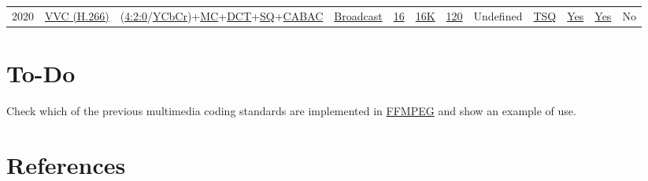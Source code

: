 \begin{tabular}{lrrrrrrrrrrr}
2020 & %
\href{https://en.wikipedia.org/wiki/Versatile_Video_Coding}{VVC (H.266)} & %
(\href{https://en.wikipedia.org/wiki/Chroma_subsampling#4:2:0}{4:2:0}/\href{https://en.wikipedia.org/wiki/JPEG#Color_space_transformation}{YCbCr})+\href{https://en.wikipedia.org/wiki/Motion_compensation}{MC}+\href{https://en.wikipedia.org/wiki/Discrete_cosine_transform}{DCT}+\href{https://en.wikipedia.org/wiki/Quantization_(signal_processing)}{SQ}+\href{https://en.wikipedia.org/wiki/Context-adaptive_variable-length_coding}{CABAC} & %
\href{https://en.wikipedia.org/wiki/Versatile_Video_Coding#Broadcast}{Broadcast} & %
\href{https://en.wikipedia.org/wiki/Versatile_Video_Coding#Concept}{16} & %
\href{https://en.wikipedia.org/wiki/16K_resolution}{16K} & %
\href{https://en.wikipedia.org/wiki/Versatile_Video_Coding#Concept}{120} & %
Undefined & %
\href{https://en.wikipedia.org/wiki/Versatile_Video_Coding#Concept}{TSQ} & %
\href{https://en.wikipedia.org/wiki/Versatile_Video_Coding#Concept}{Yes} & %
\href{https://en.wikipedia.org/wiki/Versatile_Video_Coding#Concept}{Yes} & %
No \\ %

\end{tabular}

\section{To-Do}

Check which of the previous multimedia coding standards are implemented in \href{https://ffmpeg.org/}{FFMPEG} and show an example of use.

\section{References}

\renewcommand{\addcontentsline}[3]{}%


